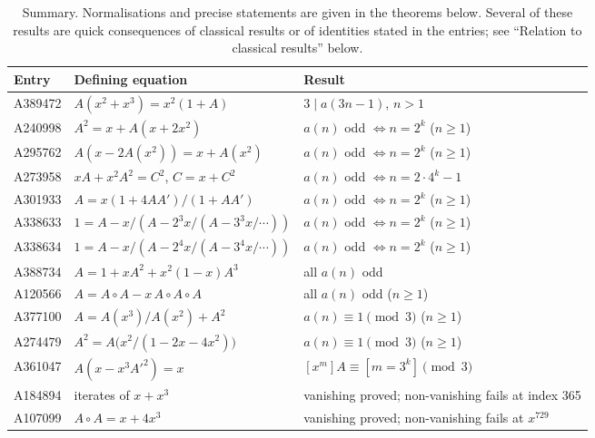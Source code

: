 \documentclass[11pt]{article}
\theoremstyle{remark}
\begin{document}
\begin{table}[ht]\centering\small
\begin{tabular}{@{}lll@{}}\toprule
Entry & Defining equation & Result\\\midrule
A389472 & $A(x^2+x^3)=x^2(1+A)$ & $3\mid a(3n-1)$, $n>1$\\
A240998 & $A^2=x+A(x+2x^2)$ & $a(n)$ odd $\iff n=2^k$ ($n\ge1$)\\
A295762 & $A(x-2A(x^2))=x+A(x^2)$ & $a(n)$ odd $\iff n=2^k$ ($n\ge1$)\\
A273958 & $xA+x^2A^2=C^2$, $C=x+C^2$ & $a(n)$ odd $\iff n=2\cdot4^k-1$\\
A301933 & $A=x(1+4AA')/(1+AA')$ & $a(n)$ odd $\iff n=2^k$ ($n\ge1$)\\
A338633 & $1=A-x/(A-2^3x/(A-3^3x/\cdots))$ & $a(n)$ odd $\iff n=2^k$ ($n\ge1$)\\
A338634 & $1=A-x/(A-2^4x/(A-3^4x/\cdots))$ & $a(n)$ odd $\iff n=2^k$ ($n\ge1$)\\
A388734 & $A=1+xA^2+x^2(1-x)A^3$ & all $a(n)$ odd\\
A120566 & $A=A\circ A-x\,A\circ A\circ A$ & all $a(n)$ odd ($n\ge1$)\\
A377100 & $A=A(x^3)/A(x^2)+A^2$ & $a(n)\equiv1\pmod3$ ($n\ge1$)\\
A274479 & $A^2=A\bigl(x^2/(1-2x-4x^2)\bigr)$ & $a(n)\equiv1\pmod3$ ($n\ge1$)\\\midrule
A361047 & $A(x-x^3A'^2)=x$ & $[x^m]A\equiv[m=3^k]\pmod3$\\
A184894 & iterates of $x+x^3$ & vanishing proved; non-vanishing fails at index 365\\
A107099 & $A\circ A=x+4x^3$ & vanishing proved; non-vanishing fails at $x^{729}$\\\bottomrule
\end{tabular}
\caption{Summary. Normalisations and precise statements are given in the
theorems below. Several of these results are quick consequences of classical
results or of identities stated in the entries; see ``Relation to classical
results'' below.}\label{tab:summary}
\end{table}
\end{document}
